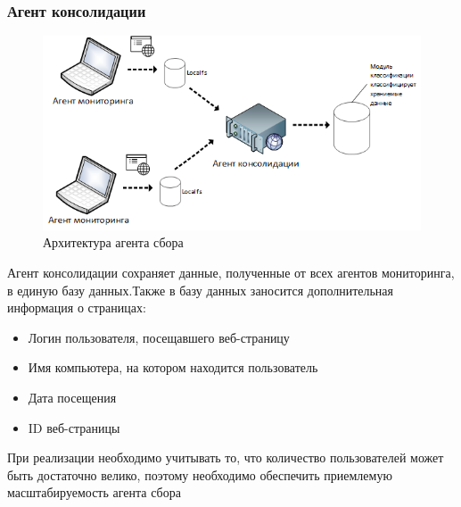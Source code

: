 \documentclass[russian, utf8, emptystyle]{eskdtext}
\begin{document}
\subsubsection {Агент консолидации}
\begin{figure}[h]
	\begin{center}
		\includegraphics[width=14cm]{pic/agent2.png}
		\caption{Архитектура агента сбора}
		\label{fig:low_sigma}
	\end{center}
\end{figure}
Агент консолидации сохраняет данные, полученные от всех агентов мониторинга, в единую базу данных.Также в базу данных заносится дополнительная информация о страницах:
\begin{itemize}
	\item Логин пользователя, посещавшего веб-страницу
	\item Имя компьютера, на котором находится пользователь
	\item Дата посещения
	\item ID веб-страницы
\end{itemize}

При реализации необходимо учитывать то, что количество пользователей может быть достаточно велико, поэтому необходимо обеспечить приемлемую масштабируемость агента сбора
\end{document}
